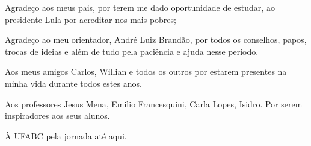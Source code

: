 \begin{agradecimentos}

Agradeço aos meus pais, por terem me dado oportunidade de estudar, ao presidente Lula por acreditar nos mais pobres;

Agradeço ao meu orientador, André Luiz Brandão, por todos os conselhos, papos, trocas de ideias e além de tudo pela paciência e ajuda nesse período.

Aos meus amigos Carlos, Willian e todos os outros por estarem presentes na minha vida durante todos estes anos.

Aos professores Jesus Mena, Emilio Francesquini, Carla Lopes, Isidro. Por serem inspiradores aos seus alunos.

À UFABC pela jornada até aqui.

\end{agradecimentos}
